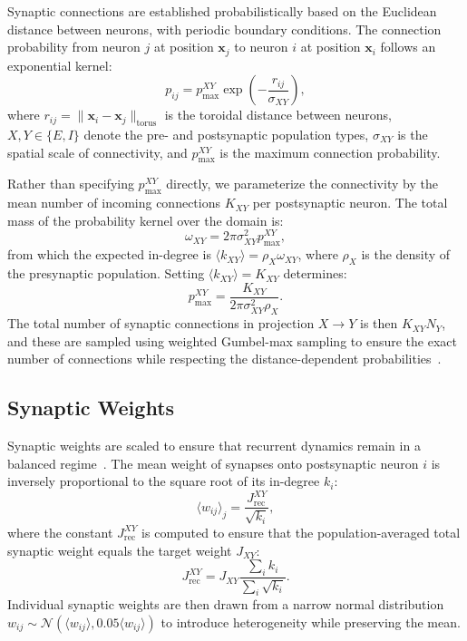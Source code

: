 \documentclass[%
	preprint, %
	amsmath,
	amssymb,
	aps,
	prx,
	floatfix,
	11pt %
]{revtex4-2}
\begin{document}
Synaptic connections are established probabilistically based on the Euclidean distance between neurons, with periodic boundary conditions. The connection probability from neuron $j$ at position $\mathbf{x}_j$ to neuron $i$ at position $\mathbf{x}_i$ follows an exponential kernel:
\begin{equation}
    p_{ij} = p_{\max}^{XY} \exp\left(-\frac{r_{ij}}{\sigma_{XY}}\right),
\end{equation}
where $r_{ij} = \|\mathbf{x}_i - \mathbf{x}_j\|_{\mathrm{torus}}$ is the toroidal distance between neurons, $X,Y \in \{E, I\}$ denote the pre- and postsynaptic population types, $\sigma_{XY}$ is the spatial scale of connectivity, and $p_{\max}^{XY}$ is the maximum connection probability.

Rather than specifying $p_{\max}^{XY}$ directly, we parameterize the connectivity by the mean number of incoming connections $K_{XY}$ per postsynaptic neuron. The total mass of the probability kernel over the domain is:
\begin{equation}
    \omega_{XY} = 2\pi \sigma_{XY}^2 p_{\max}^{XY},
\end{equation}
from which the expected in-degree is $\langle k_{XY} \rangle = \rho_X \omega_{XY}$, where $\rho_X$ is the density of the presynaptic population. Setting $\langle k_{XY} \rangle = K_{XY}$ determines:
\begin{equation}
    p_{\max}^{XY} = \frac{K_{XY}}{2\pi \sigma_{XY}^2 \rho_X}.
\end{equation}
The total number of synaptic connections in projection $X \to Y$ is then $K_{XY} N_Y$, and these are sampled using weighted Gumbel-max sampling to ensure the exact number of connections while respecting the distance-dependent probabilities~\cite{Kool2019}.

\subsection{Synaptic Weights}

Synaptic weights are scaled to ensure that recurrent dynamics remain in a balanced regime~\cite{}. The mean weight of synapses onto postsynaptic neuron $i$ is inversely proportional to the square root of its in-degree $k_i$:
\begin{equation}
    \langle w_{ij} \rangle_j = \frac{J^{XY}_{\mathrm{rec}}}{\sqrt{k_i}},
\end{equation}
where the constant $J^{XY}_{\mathrm{rec}}$ is computed to ensure that the population-averaged total synaptic weight equals the target weight $J_{XY}$:
\begin{equation}
    J^{XY}_{\mathrm{rec}} = J_{XY} \frac{\sum_i k_i}{\sum_i \sqrt{k_i}}.
\end{equation}
Individual synaptic weights are then drawn from a narrow normal distribution $w_{ij} \sim \mathcal{N}(\langle w_{ij} \rangle, 0.05\langle w_{ij} \rangle)$ to introduce heterogeneity while preserving the mean.
\end{document}
